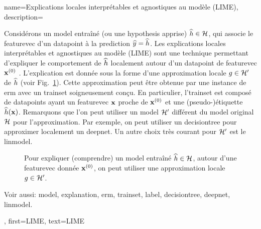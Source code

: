 {
	name={Explications locales interprétables et agnostiques au modèle (LIME)},
	description={
		Considérons 
		un \gls{model} entraîné (ou une \gls{hypothesis} apprise) $\widehat{h} \in \mathcal{H}$, 
		qui associe le \gls{featurevec} d’un \gls{datapoint} à la \gls{prediction} $\widehat{y} = \widehat{h}$. 
		Les explications locales interprétables et agnostiques au modèle (LIME) sont une technique permettant 
		d’expliquer le comportement de $\widehat{h}$ localement autour d’un \gls{datapoint} de \gls{featurevec} ${\bf x}^{(0)}$ \cite{Ribeiro2016}. 
		L’explication est donnée sous la forme d’une approximation locale $g \in \mathcal{H}'$ de $\widehat{h}$ (voir Fig.\ \ref{fig_lime_dict}). 
		Cette approximation peut être obtenue par une instance de \gls{erm} avec un \gls{trainset} soigneusement conçu. 
		En particulier, l'\gls{trainset} est composé de \glspl{datapoint} ayant un \gls{featurevec} ${\bf x}$ proche de ${\bf x}^{(0)}$ 
		et une (pseudo-)étiquette $\widehat{h}({\bf x})$. 
		Remarquons que l’on peut utiliser un \gls{model} $\mathcal{H}'$ différent du \gls{model} original $\mathcal{H}$ pour l’approximation. 
		Par exemple, on peut utiliser un \gls{decisiontree} pour approximer localement un \gls{deepnet}. 
		Un autre choix très courant pour $\mathcal{H}'$ est le \gls{linmodel}. 
		\begin{figure}[H]
			\begin{center}
			\end{center}
			\caption{Pour expliquer (comprendre) un \gls{model} entraîné $\widehat{h} \in \mathcal{H}$, autour d’une 
				\gls{featurevec} donnée ${\bf x}^{(0)}$, on peut utiliser une approximation locale $g \in \mathcal{H}'$.}
			\label{fig_lime_dict}
		\end{figure}
		Voir aussi: \gls{model}, \gls{explanation}, \gls{erm}, \gls{trainset}, \gls{label}, \gls{decisiontree}, \gls{deepnet}, \gls{linmodel}.},
		first={LIME},
		text={LIME}
	}

